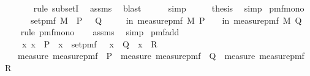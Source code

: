 \begin{isabellebody}
\ \ \ \ \ \isamarkupfalse%
\ {\isacharparenleft}{\kern0pt}rule\ subsetI{\isacharparenright}{\kern0pt}\ \isamarkupfalse%
\ assms\ \isamarkupfalse%
\ blast\isanewline
\ \ \ \ \isamarkupfalse%
\ simp\isanewline
\ \ \isamarkupfalse%
\ \isamarkupfalse%
\ {\isacharquery}{\kern0pt}thesis\ \isamarkupfalse%
\ simp\isanewline
{}\isamarkupfalse%
%
\endisatagproof
{\isafoldproof}%
%
\isadelimproof
\isanewline
%
\endisadelimproof
\isanewline
{}\isamarkupfalse%
\ pmf{\isacharunderscore}{\kern0pt}mono{\isacharunderscore}{\kern0pt}{}{\isacharcolon}{\kern0pt}\isanewline
\ \ \ {\isachardoublequoteopen}{\isasymAnd}{\isasymomega}{\isachardot}{\kern0pt}\ {\isasymomega}\ {\isasymin}\ set{\isacharunderscore}{\kern0pt}pmf\ M\ {\isasymLongrightarrow}\ P\ {\isasymomega}\ {\isasymLongrightarrow}\ Q\ {\isasymomega}{\isachardoublequoteclose}\isanewline
\ \ \ {\isachardoublequoteopen}{\isasymP}{\isacharparenleft}{\kern0pt}{\isasymomega}\ in\ measure{\isacharunderscore}{\kern0pt}pmf\ M{\isachardot}{\kern0pt}\ P\ {\isasymomega}{\isacharparenright}{\kern0pt}\ {\isasymle}\ {\isasymP}{\isacharparenleft}{\kern0pt}{\isasymomega}\ in\ measure{\isacharunderscore}{\kern0pt}pmf\ M{\isachardot}{\kern0pt}\ Q\ {\isasymomega}{\isacharparenright}{\kern0pt}{\isachardoublequoteclose}\isanewline
%
\isadelimproof
\ \ %
\endisadelimproof
%
\isatagproof
{}\isamarkupfalse%
\ {\isacharparenleft}{\kern0pt}rule\ pmf{\isacharunderscore}{\kern0pt}mono{\isacharunderscore}{\kern0pt}{}{\isacharparenright}{\kern0pt}\isanewline
\ \ \isamarkupfalse%
\ assms\ \isamarkupfalse%
\ simp%
\endisatagproof
{\isafoldproof}%
%
\isadelimproof
\isanewline
%
\endisadelimproof
\isanewline
{}\isamarkupfalse%
\ pmf{\isacharunderscore}{\kern0pt}add{\isacharcolon}{\kern0pt}\isanewline
\ \ \ \ {\isachardoublequoteopen}{\isasymAnd}x{\isachardot}{\kern0pt}\ x\ {\isasymin}\ P\ {\isasymLongrightarrow}\ x\ {\isasymin}\ set{\isacharunderscore}{\kern0pt}pmf\ {\isasymOmega}\ {\isasymLongrightarrow}\ x\ {\isasymin}\ Q\ {\isasymor}\ x\ {\isasymin}\ R{\isachardoublequoteclose}\isanewline
\ \ \ {\isachardoublequoteopen}measure\ {\isacharparenleft}{\kern0pt}measure{\isacharunderscore}{\kern0pt}pmf\ {\isasymOmega}{\isacharparenright}{\kern0pt}\ P\ {\isasymle}\ measure\ {\isacharparenleft}{\kern0pt}measure{\isacharunderscore}{\kern0pt}pmf\ {\isasymOmega}{\isacharparenright}{\kern0pt}\ Q\ {\isacharplus}{\kern0pt}\ measure\ {\isacharparenleft}{\kern0pt}measure{\isacharunderscore}{\kern0pt}pmf\ {\isasymOmega}{\isacharparenright}{\kern0pt}\ R{\isachardoublequoteclose}\isanewline

\end{isabellebody}
